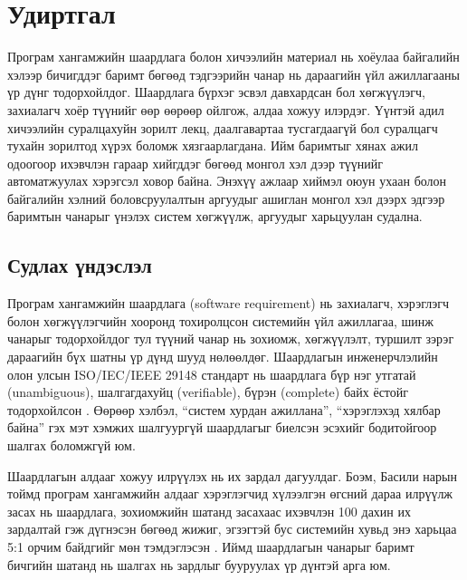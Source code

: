 
{}
\label{Introduction}

\section*{Удиртгал}
Програм хангамжийн шаардлага болон хичээлийн материал нь хоёулаа байгалийн хэлээр бичигддэг баримт бөгөөд тэдгээрийн чанар нь дараагийн үйл ажиллагааны үр дүнг тодорхойлдог. Шаардлага бүрхэг эсвэл давхардсан бол хөгжүүлэгч, захиалагч хоёр түүнийг өөр өөрөөр ойлгож, алдаа хожуу илэрдэг. Үүнтэй адил хичээлийн суралцахуйн зорилт лекц, даалгавартаа тусгагдаагүй бол суралцагч тухайн зорилтод хүрэх боломж хязгаарлагдана. Ийм баримтыг хянах ажил одоогоор ихэвчлэн гараар хийгддэг бөгөөд монгол хэл дээр түүнийг автоматжуулах хэрэгсэл ховор байна. Энэхүү ажлаар хиймэл оюун ухаан болон байгалийн хэлний боловсруулалтын аргуудыг ашиглан монгол хэл дээрх эдгээр баримтын чанарыг үнэлэх систем хөгжүүлж, аргуудыг харьцуулан судална.

\subsection*{Судлах үндэслэл}
Програм хангамжийн шаардлага (software requirement) нь захиалагч, хэрэглэгч болон хөгжүүлэгчийн хооронд тохиролцсон системийн үйл ажиллагаа, шинж чанарыг тодорхойлдог тул түүний чанар нь зохиомж, хөгжүүлэлт, туршилт зэрэг дараагийн бүх шатны үр дүнд шууд нөлөөлдөг. Шаардлагын инженерчлэлийн олон улсын ISO/IEC/IEEE 29148 стандарт нь шаардлага бүр нэг утгатай (unambiguous), шалгагдахуйц (verifiable), бүрэн (complete) байх ёстойг тодорхойлсон \cite{iso29148}. Өөрөөр хэлбэл, \enquote{систем хурдан ажиллана}, \enquote{хэрэглэхэд хялбар байна} гэх мэт хэмжих шалгуургүй шаардлагыг биелсэн эсэхийг бодитойгоор шалгах боломжгүй юм.

Шаардлагын алдааг хожуу илрүүлэх нь их зардал дагуулдаг. Боэм, Басили нарын тоймд програм хангамжийн алдааг хэрэглэгчид хүлээлгэн өгсний дараа илрүүлж засах нь шаардлага, зохиомжийн шатанд засахаас ихэвчлэн 100 дахин их зардалтай гэж дүгнэсэн бөгөөд жижиг, эгзэгтэй бус системийн хувьд энэ харьцаа 5:1 орчим байдгийг мөн тэмдэглэсэн \cite{boehm2001}. Иймд шаардлагын чанарыг баримт бичгийн шатанд нь шалгах нь зардлыг бууруулах үр дүнтэй арга юм.

